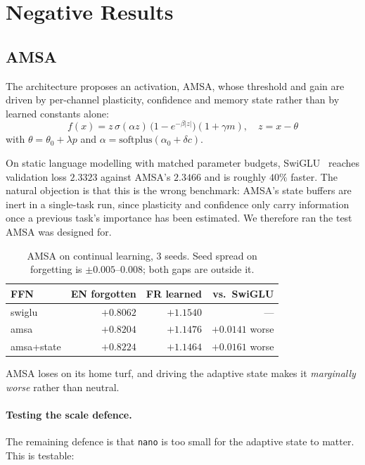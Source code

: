 \documentclass[10pt,twocolumn]{article}
\begin{document}
\section{Negative Results}
\label{sec:negative}

\subsection{AMSA}

The architecture proposes an activation, AMSA, whose threshold and gain are
driven by per-channel plasticity, confidence and memory state rather than by
learned constants alone:
\begin{equation}
f(x) = z\,\sigma(\alpha z)\,\big(1 - e^{-\beta|z|}\big)(1+\gamma m),
\quad z = x - \theta
\end{equation}
with $\theta = \theta_0 + \lambda p$ and
$\alpha = \text{softplus}(\alpha_0 + \delta c)$.

On static language modelling with matched parameter budgets, SwiGLU~\cite{shazeer2020}
reaches validation loss $2.3323$ against AMSA's $2.3466$ and is roughly $40\%$
faster. The natural objection is that this is the wrong benchmark: AMSA's state
buffers are inert in a single-task run, since plasticity and confidence only
carry information once a previous task's importance has been estimated. We
therefore ran the test AMSA was designed for.

\begin{table}[h]
\centering\small
\begin{tabular}{@{}lrrr@{}}
\toprule
FFN & EN forgotten & FR learned & vs.\ SwiGLU \\
\midrule
swiglu & $\mathbf{+0.8062}$ & $+1.1540$ & --- \\
amsa & $+0.8204$ & $+1.1476$ & $+0.0141$ worse \\
amsa+state & $+0.8224$ & $+1.1464$ & $+0.0161$ worse \\
\bottomrule
\end{tabular}
\caption{AMSA on continual learning, 3 seeds. Seed spread on forgetting is
$\pm0.005$--$0.008$; both gaps are outside it.}
\end{table}

AMSA loses on its home turf, and driving the adaptive state makes it
\emph{marginally worse} rather than neutral.

\paragraph{Testing the scale defence.} The remaining defence is that
\texttt{nano} is too small for the adaptive state to matter. This is testable:
\end{document}
